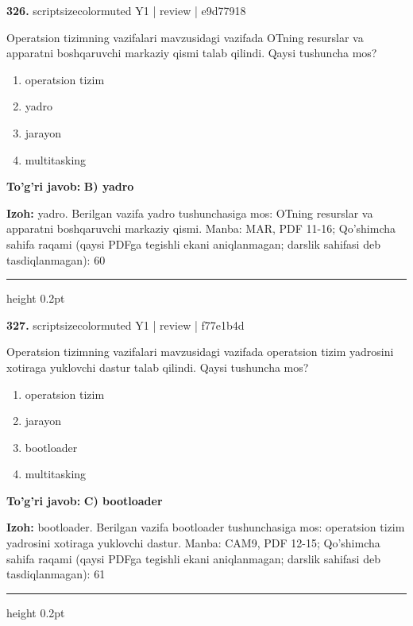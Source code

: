 \documentclass[10pt,a4paper]{article}
\begin{document}
{\bfseries\sffamily\color{ink} 326.} {scriptsizecolor{muted} Y1 | review | e9d77918}
\par
Operatsion tizimning vazifalari mavzusidagi vazifada OTning resurslar va apparatni boshqaruvchi markaziy qismi talab qilindi. Qaysi tushuncha mos?
\begin{enumerate}[label=\Alph*),leftmargin=9mm]
\item operatsion tizim
\item yadro
\item jarayon
\item multitasking
\end{enumerate}
\begin{tcolorbox}[enhanced,breakable,colback=teal!4,colframe=teal!60!black,boxrule=0.45pt,arc=1.2mm,left=2.7mm,right=2.7mm,top=1.8mm,bottom=1.8mm,before skip=2mm,after skip=2mm]
{\bfseries\sffamily\color{teal}To'g'ri javob:} \textbf{B) yadro}
\par\smallskip
{\bfseries Izoh:} yadro. Berilgan vazifa yadro tushunchasiga mos: OTning resurslar va apparatni boshqaruvchi markaziy qismi. Manba: MAR, PDF 11-16; Qo'shimcha sahifa raqami (qaysi PDFga tegishli ekani aniqlanmagan; darslik sahifasi deb tasdiqlanmagan): 60
\end{tcolorbox}
\vspace{2mm}\hrule height 0.2pt\vspace{3mm}

{\bfseries\sffamily\color{ink} 327.} {scriptsizecolor{muted} Y1 | review | f77e1b4d}
\par
Operatsion tizimning vazifalari mavzusidagi vazifada operatsion tizim yadrosini xotiraga yuklovchi dastur talab qilindi. Qaysi tushuncha mos?
\begin{enumerate}[label=\Alph*),leftmargin=9mm]
\item operatsion tizim
\item jarayon
\item bootloader
\item multitasking
\end{enumerate}
\begin{tcolorbox}[enhanced,breakable,colback=teal!4,colframe=teal!60!black,boxrule=0.45pt,arc=1.2mm,left=2.7mm,right=2.7mm,top=1.8mm,bottom=1.8mm,before skip=2mm,after skip=2mm]
{\bfseries\sffamily\color{teal}To'g'ri javob:} \textbf{C) bootloader}
\par\smallskip
{\bfseries Izoh:} bootloader. Berilgan vazifa bootloader tushunchasiga mos: operatsion tizim yadrosini xotiraga yuklovchi dastur. Manba: CAM9, PDF 12-15; Qo'shimcha sahifa raqami (qaysi PDFga tegishli ekani aniqlanmagan; darslik sahifasi deb tasdiqlanmagan): 61
\end{tcolorbox}
\vspace{2mm}\hrule height 0.2pt\vspace{3mm}
\end{document}
